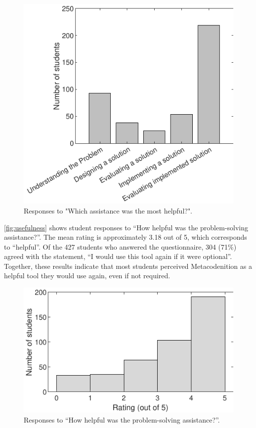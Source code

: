 \documentclass[sigconf,anonymous]{acmart}
\begin{document}
\begin{figure}[h!]
  \centering
  \includegraphics[width=\columnwidth]{intervention_responses}
  \caption{Responses to "Which assistance was the most helpful?".}
  \label{fig:interventions}
\end{figure}

\autoref{fig:usefulness} shows student responses to ``How helpful was the problem-solving assistance?''. The mean rating is approximately 3.18 out of 5, which corresponds to ``helpful''. Of the 427 students who answered the questionnaire, 304 (71\%) agreed with the statement, ``I would use this tool again if it were optional''. Together, these results indicate that most students perceived Metacodenition as a helpful tool they would use again, even if not required.

\begin{figure}[h!]
  \centering
  \includegraphics[width=\columnwidth]{usefulness_responses}
  \caption{Responses to ``How helpful was the problem-solving assistance?''.}
  \label{fig:usefulness}
\end{figure}
\end{document}
